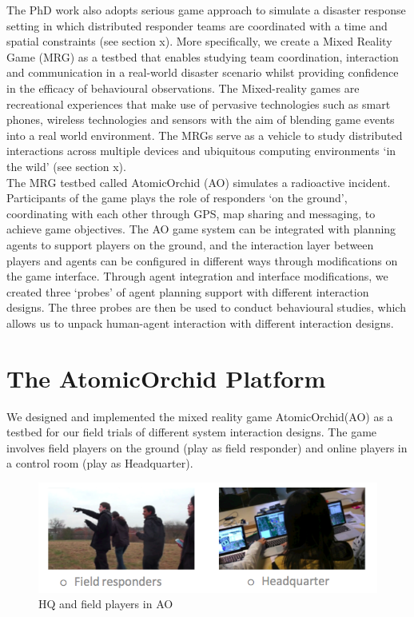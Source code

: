 The PhD work also adopts serious game approach to simulate a disaster response setting in which distributed responder teams are coordinated with a time and spatial constraints (see section x). More specifically, we create a Mixed Reality Game (MRG) as a testbed that enables studying team coordination, interaction and communication in a real-world disaster scenario whilst providing confidence in the efficacy of behavioural observations. The Mixed-reality games are recreational experiences that make use of pervasive technologies such as smart phones, wireless technologies and sensors with the aim of blending game events into a real world environment. The MRGs serve as a vehicle to study distributed interactions across multiple devices and ubiquitous computing environments `in the wild' (see section x).\\

The MRG testbed called AtomicOrchid (AO) simulates a radioactive incident. Participants of the game plays the role of responders `on the ground', coordinating with each other through GPS, map sharing and messaging, to achieve game objectives. The AO game system can be integrated with planning agents to support players on the ground, and the interaction layer between players and agents can be configured in different ways through modifications on the game interface. Through agent integration and interface modifications, we created three `probes' of agent planning support with different interaction designs. The three probes are then be used to conduct behavioural studies, which allows us to unpack human-agent interaction with different interaction designs.\\

\section{The AtomicOrchid Platform}\label{sec:AOdescription}
We designed and implemented the mixed reality game AtomicOrchid(AO) as a testbed for our field trials of different system interaction designs. The game involves field players on the ground (play as field responder) and online players in a control room (play as Headquarter).

\begin{figure}[h]
  \centering
  \includegraphics[width=1\textwidth]{img/approach/GameComponents}
  \caption{HQ and field players in AO}
  \label{fig:AOroles}
\end{figure}


